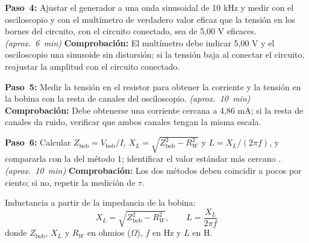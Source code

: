 \documentclass[12pt]{article}
\begin{document}
\begin{pasos}
  \item \textbf{Paso~4:} Ajustar el generador a una onda sinusoidal de 10 kHz y medir con el osciloscopio y con el multímetro de verdadero valor eficaz que la tensión en los bornes del circuito, con el circuito conectado, sea de 5,00 V eficaces. \emph{(aprox.~\SI{6}{\minute})} \textbf{Comprobación:} El multímetro debe indicar 5,00 V y el osciloscopio una sinusoide sin distorsión; si la tensión baja al conectar el circuito, reajustar la amplitud con el circuito conectado.
  \item \textbf{Paso~5:} Medir la tensión en el resistor para obtener la corriente y la tensión en la bobina con la resta de canales del osciloscopio. \emph{(aprox.~\SI{10}{\minute})} \textbf{Comprobación:} Debe obtenerse una corriente cercana a 4,86 mA; si la resta de canales da ruido, verificar que ambos canales tengan la misma escala.
  \item \textbf{Paso~6:} Calcular $Z_{\mathrm{bob}} = V_{\mathrm{bob}}/I$, $X_L = \sqrt{Z_{\mathrm{bob}}^2 - R_W^2}$ y $L = X_L/(2\pi f)$, y compararla con la del método 1; identificar el valor estándar más cercano \cite{ref2}. \emph{(aprox.~\SI{10}{\minute})} \textbf{Comprobación:} Los dos métodos deben coincidir a pocos por ciento; si no, repetir la medición de \ensuremath{\tau}.
\par Inductancia a partir de la impedancia de la bobina:
\begin{equation}
  X_L = \sqrt{Z_{\mathrm{bob}}^2 - R_W^2}, \qquad L = \frac{X_L}{2\pi f}
  \label{eq:paso-6}
\end{equation}
donde $Z_{\mathrm{bob}}$, $X_L$ y $R_W$ en ohmios (\ensuremath{\Omega}), $f$ en Hz y $L$ en H.
\end{pasos}
\end{document}

